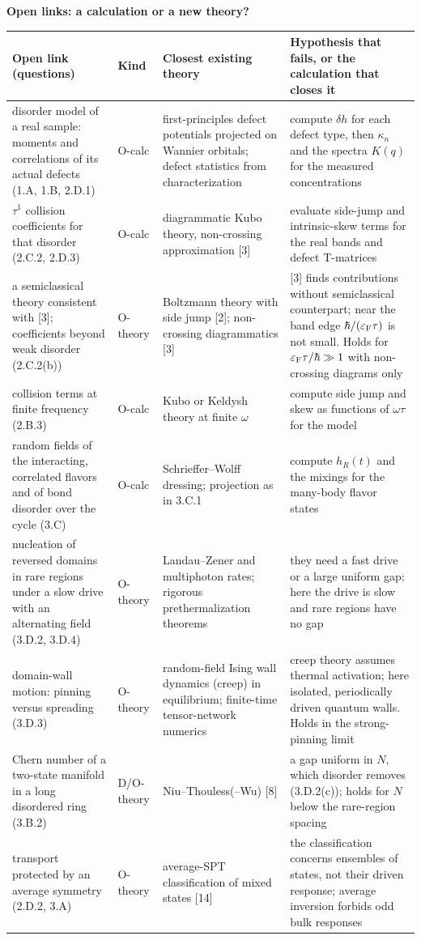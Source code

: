 \documentclass[11pt,a4paper]{article}
\newcommand{\eF}{\varepsilon_{\rm F}}
\newcommand{\smallheading}[1]{\par\Needspace{6\baselineskip}\medskip\textbf{#1}\par}
\begin{document}
\smallheading{Open links: a calculation or a new theory?}
{\small\begin{longtable}{@{}p{36mm}p{16mm}p{45mm}p{55mm}@{}}\toprule
Open link (questions)&Kind&Closest existing theory&Hypothesis that fails, or the calculation that closes it\\\midrule\endhead
disorder model of a real sample: moments and correlations of its actual defects (1.A, 1.B, 2.D.1)&O-calc&first-principles defect potentials projected on Wannier orbitals; defect statistics from characterization&compute $\delta h$ for each defect type, then $\kappa_n$ and the spectra $K(q)$ for the measured concentrations\\
$\tau^1$ collision coefficients for that disorder (2.C.2, 2.D.3)&O-calc&diagrammatic Kubo theory, non-crossing approximation [3]&evaluate side-jump and intrinsic-skew terms for the real bands and defect T-matrices\\
a semiclassical theory consistent with [3]; coefficients beyond weak disorder (2.C.2(b))&O-theory&Boltzmann theory with side jump [2]; non-crossing diagrammatics [3]&[3] finds contributions without semiclassical counterpart; near the band edge $\hbar/(\eF\tau)$ is not small. Holds for $\eF\tau/\hbar\gg1$ with non-crossing diagrams only\\
collision terms at finite frequency (2.B.3)&O-calc&Kubo or Keldysh theory at finite $\omega$&compute side jump and skew as functions of $\omega\tau$ for the model\\
random fields of the interacting, correlated flavors and of bond disorder over the cycle (3.C)&O-calc&Schrieffer--Wolff dressing; projection as in 3.C.1&compute $h_R(t)$ and the mixings for the many-body flavor states\\
nucleation of reversed domains in rare regions under a slow drive with an alternating field (3.D.2, 3.D.4)&O-theory&Landau--Zener and multiphoton rates; rigorous prethermalization theorems&they need a fast drive or a large uniform gap; here the drive is slow and rare regions have no gap\\
domain-wall motion: pinning versus spreading (3.D.3)&O-theory&random-field Ising wall dynamics (creep) in equilibrium; finite-time tensor-network numerics&creep theory assumes thermal activation; here isolated, periodically driven quantum walls. Holds in the strong-pinning limit\\
Chern number of a two-state manifold in a long disordered ring (3.B.2)&D/O-theory&Niu--Thouless(--Wu) [8]&a gap uniform in $N$, which disorder removes (3.D.2(c)); holds for $N$ below the rare-region spacing\\
transport protected by an average symmetry (2.D.2, 3.A)&O-theory&average-SPT classification of mixed states [14]&the classification concerns ensembles of states, not their driven response; average inversion forbids odd bulk responses\\
\bottomrule\end{longtable}}
\end{document}
